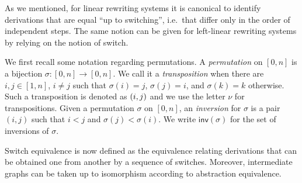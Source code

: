 \documentclass[a4paper,UKenglish,cleveref,pdftex,thm-restate,numberwithinsect]{lipics-v2021}
\newcommand{\interval}[2][1]{\ensuremath{[{#1},{#2}]}}
\newcommand{\perm}{\sigma}
\newcommand{\dder}[1]{\mathscr{#1}}
\newcommand{\der}[1]{\underline{\dder{#1}}}
\newcommand{\inv}[1]{\mathsf{inv}({#1})}
\newcommand{\shift}[1]{\ensuremath{\mathrel{{\leftrightsquigarrow}_{#1}}}}
\begin{document}
As we mentioned, for linear rewriting systems
it is canonical to identify
derivations that are equal ``up to switching'', i.e.~that differ
only in the order of independent steps. The same notion can be given
for left-linear rewriting systems by relying on the notion of switch.


We first recall some %
notation regarding permutations. 
A \emph{permutation} on
$\interval[0]{n}$ is a bijection
$\sigma : \interval[0]{n} \to \interval[0]{n}$. We call it a
\emph{transposition} when there are $i, j \in \interval{n}$,
$i \neq j$ such that $\sigma(i)=j$, $\sigma(j) = i$, and
$\sigma(k) = k$ otherwise. Such a transposition is
denoted as
$\transp{i}[j]$ and we use the letter $\nu$ for transpositions.
% 
Given a permutation $\perm$ on $\interval[0]{n}$, an \emph{inversion}
for $\sigma$ is a pair $(i,j)$ such that $i<j$ and
$\sigma(j)< \sigma(i)$. We write $\inv{\sigma}$ for the set of
inversions of $\perm$.







Switch equivalence is now defined as the equivalence relating derivations that 
can be obtained one from another by a sequence of switches. Moreover, intermediate graphs can be taken up to isomorphism according to abstraction equivalence.
\end{document}
